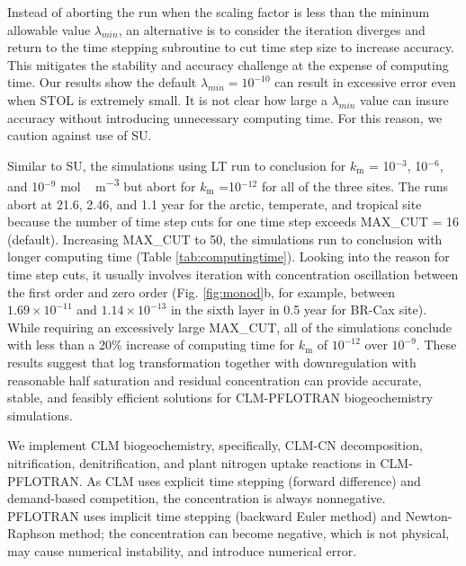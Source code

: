\documentclass[gmd, manuscript]{copernicus}
\begin{document}
Instead of aborting the run when the scaling factor is less than the mininum
allowable value $\lambda_{min}$, an alternative is to consider the iteration
diverges and return to the time stepping subroutine to cut time step size to
increase accuracy. This mitigates the stability and accuracy challenge at the
expense of computing time. Our results show the default $\lambda_{min} =
10^{-10}$ can result in excessive error even when STOL is extremely small. It
is not clear how large a $\lambda_{min}$ value can insure accuracy without
introducing unnecessary computing time. For this
reason, we caution against use of SU. 

Similar to SU, the simulations using LT run to conclusion for $k_\text{m}$ =
10$^{-3}$, 10$^{-6}$, and 10$^{-9}$ \unit{mol\,m^{-3}} but abort for
$k_\text{m}$ =10$^{-12}$ for all of the three sites. The runs abort at 21.6,
2.46, and 1.1 year for the arctic, temperate, and tropical site because the
number of time step cuts for one time step exceeds MAX\_CUT = 16 (default).
Increasing MAX\_CUT to 50, the simulations run to conclusion with longer
computing time (Table \ref{tab:computingtime}). Looking into the reason for
time step cuts, it usually involves iteration with  concentration
oscillation between the first order and zero order (Fig. \ref{fig:monod}b,
for example, between $1.69\times10^{-11}$ and $1.14\times10^{-13}$ in the sixth
layer in 0.5 year for BR-Cax site). While requiring an excessively large
MAX\_CUT, all of the simulations conclude with less than a 20\% increase of
computing time for $k_\text{m}$ of $10^{-12}$ over $10^{-9}$. These results
suggest that log transformation together with downregulation with reasonable
half saturation and residual concentration can provide accurate, stable, and
feasibly efficient solutions for CLM-PFLOTRAN biogeochemistry simulations.  
   
  

%

We implement CLM biogeochemistry, specifically, CLM-CN decomposition,
nitrification, denitrification, and plant nitrogen uptake reactions in CLM-PFLOTRAN. As
CLM uses explicit time stepping (forward difference) and demand-based
competition, the concentration is always nonnegative. PFLOTRAN uses implicit
time stepping (backward Euler method) and Newton-Raphson method; the
concentration can become negative, which is not physical, may cause numerical
instability, and introduce numerical error. 
\end{document}
